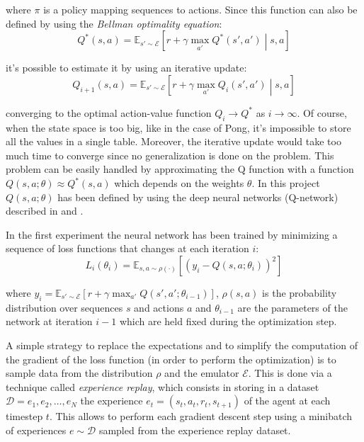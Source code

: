 \documentclass[a4paper]{article}
\numberwithin{equation}{section} %
\numberwithin{figure}{section} %
\numberwithin{table}{section} %
\theoremstyle{definition}
\begin{document}
\noindent where $\pi$ is a policy mapping sequences to actions. Since this function
can also be defined by using the \textit{Bellman optimality equation}:
\begin{equation*}
	Q^*(s, a) = \mathbb{E}_{s' \sim \mathcal{E}} \left[ r + \gamma \max_{a'} Q^*(s', a') \middle| s, a \right]
\end{equation*}

\noindent it's possible to estimate it by using an iterative update:
\begin{equation*}
	Q_{i+1}(s, a) = \mathbb{E}_{s' \sim \mathcal{E}} \left[ r + \gamma \max_{a'} Q_{i}(s', a') \middle| s, a \right]
\end{equation*}

\noindent converging to the optimal action-value function $Q_i \rightarrow Q^*$
as $i \rightarrow \infty$. Of course, when the state space is too big, like
in the case of Pong, it's impossible to store all the values in a single table.
Moreover, the iterative update would take too much time to converge since no
generalization is done on the problem. This problem can be easily handled by
approximating the Q function with a function $Q(s, a; \theta) \approx Q^*(s, a)$
which depends on the weights $\theta$. In this project $Q(s, a; \theta)$ has been
defined by using the deep neural networks (Q-network) described in
\cite{mnih2013playing} and \cite{mnih2015humanlevel}.

In the first experiment the neural network has been trained by minimizing
a sequence of loss functions that changes at each iteration $i$:
\begin{equation}
	\label{eq:loss-function-dqn13}
	L_i(\theta_i) = \mathbb{E}_{s, a \sim \rho(\cdot)} \left[ (y_i - Q(s, a; \theta_i))^2 \right]
\end{equation}

\noindent where $y_i = \mathbb{E}_{s' \sim \mathcal{E}} \left[ r + \gamma \max_{a'} Q(s', a'; \theta_{i-1}) \right]$,
$\rho(s, a)$ is the probability distribution over sequences $s$ and actions $a$
and $\theta_{i-1}$ are the parameters of the network at iteration $i-1$ which
are held fixed during the optimization step.

A simple strategy to replace the expectations and to simplify the computation
of the gradient of the
loss function (in order to perform the optimization) is to sample data from the
distribution $\rho$ and the emulator $\mathcal{E}$. This is done via a technique
called \textit{experience replay}, which consists in storing in a dataset
$\mathcal{D} = e_1, e_2, \dots, e_N$ the experience
$e_t = \left( s_t, a_t, r_t, s_{t+1} \right)$ of the agent at each timestep $t$.
This allows to perform each gradient descent step using a minibatch of experiences
$e \sim \mathcal{D}$
sampled from the experience replay dataset.
\end{document}
